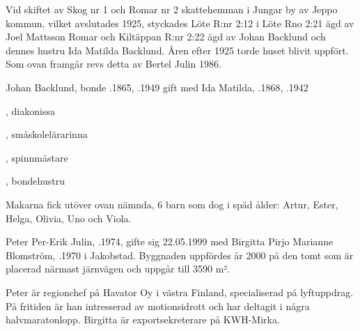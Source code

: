 %
Vid skiftet av Skog nr 1 och Romar nr 2 skattehemman i Jungar by av Jeppo kommun, vilket avslutades 1925, styckades Löte R:nr 2:12 i Löte Rno 2:21 ägd av Joel Mattsson Romar och Kiltäppan  R:nr 2:22 ägd av Johan Backlund och dennes hustru Ida Matilda Backlund. Åren efter 1925 torde huset blivit uppfört. Som ovan framgår revs detta av Bertel Julin 1986.

Johan Backlund, bonde .1865, .1949 gift med Ida Matilda, .1868, .1942
\begin{jhchildren}
  \item {}, diakonissa
  \item {}, småskolelärarinna
  \item {}, spinnmästare
  \item {}, bondehustru
  \item {}
\end{jhchildren}
Makarna fick utöver ovan nämnda, 6 barn som dog i späd ålder: Artur, Ester, Helga, Olivia, Uno och Viola.


%



%
Peter Per-Erik Julin, .1974, gifte sig 22.05.1999 med Birgitta Pirjo Marianne Blomström, .1970 i Jakobstad. Byggnaden uppfördes år 2000 på den tomt som är placerad närmast järnvägen och uppgår till 3590 m².

Peter är regionchef på Havator Oy i västra Finland, specialiserad på lyftuppdrag. På fritiden är han intresserad av motionsidrott och har deltagit i några halvmaratonlopp. Birgitta är exportsekreterare på KWH-Mirka.
\begin{jhchildren}
  \item {}
  \item {}
\end{jhchildren}



